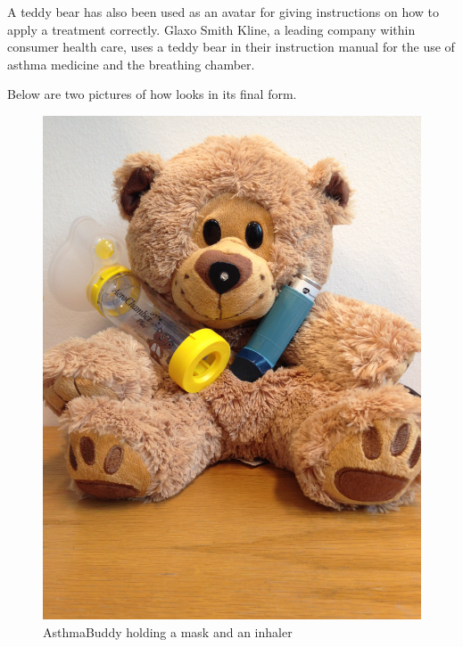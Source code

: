 A teddy bear has also been used as an avatar for giving instructions on how to apply a treatment correctly. Glaxo Smith Kline, a leading company within consumer health care, uses a teddy bear in their instruction manual for the use of asthma medicine and the breathing chamber\cite{glaxosmithkline}. 

Below are two pictures of how \ab{} looks in its final form. 

\begin{figure}[H] 
	\begin{minipage}[t]{0.4\linewidth}
	\centering
		\includegraphics[width=0.3\paperwidth]{Pictures/abandinhaler.jpg}
	\caption[AsthmaBuddy holding a mask and an inhaler]{AsthmaBuddy holding a mask and an inhaler}
	\label{fig:asthmabuddyandinhaler}
	\end{minipage}
	\hspace{2.0cm}
	\begin{minipage}[t]{0.4\linewidth}
		\centering

\end{minipage}
\end{figure}
